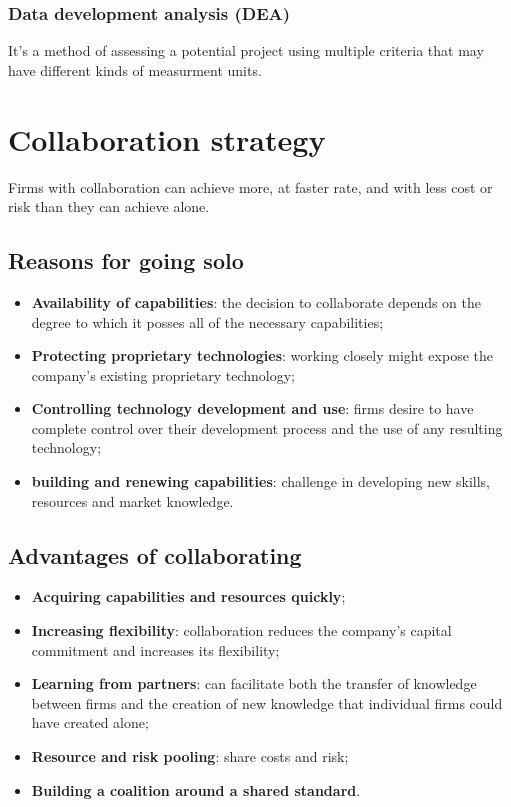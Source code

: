 \documentclass[12pt]{article}
\begin{document}
\subsubsection{Data development analysis (DEA)}
It's a method of assessing a potential project using multiple criteria that may have different kinds of measurment units.
\section{Collaboration strategy}
Firms with collaboration can achieve more, at faster rate, and with less cost or risk than they can achieve alone.
\subsection{Reasons for going solo}
\begin{itemize}
    \item \textbf{Availability of capabilities}: the decision to collaborate depends on the degree to which it posses all of the necessary capabilities;
    \item \textbf{Protecting proprietary technologies}: working closely might expose the company's existing proprietary technology;
    \item \textbf{Controlling technology development and use}: firms desire to have complete control over their development process and the use of any resulting technology;
    \item \textbf{building and renewing capabilities}: challenge in developing new skills, resources and market knowledge.
\end{itemize}
\subsection{Advantages of collaborating}
\begin{itemize}
    \item \textbf{Acquiring capabilities and resources quickly}; 
    \item \textbf{Increasing flexibility}: collaboration reduces the company's capital commitment and increases its flexibility; 
    \item \textbf{Learning from partners}: can facilitate both the transfer of knowledge between firms and the creation of new knowledge that individual firms could have created alone; 
    \item \textbf{Resource and risk pooling}: share costs and risk;
    \item \textbf{Building a coalition around a shared standard}. 
\end{itemize}
\end{document}
